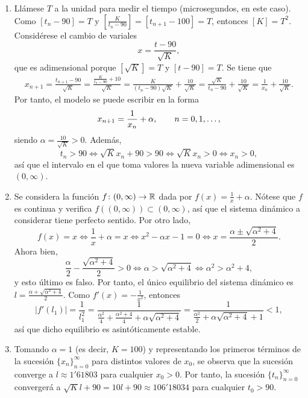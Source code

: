 \documentclass[11pt]{report}
\begin{document}
\begin{solution}
    \hfill
    \begin{enumerate}
        \item Llámese $T$ a la unidad para medir el tiempo (microsegundos, en este caso). Como $[t_n-90] = T$ y $[\frac{K}{t_n-90}] = [t_{n+1}-100]= T$, entonces $[K] = T^2$. Considérese el cambio de variales
        \[x = \frac{t-90}{\sqrt{K}},\]
        que es adimensional porque $[\sqrt{K}] = T$ y $[t-90] = T$. Se tiene que
        \begin{align*}
            x_{n+1} = \frac{t_{n+1}-90}{\sqrt{K}} =  \frac{\frac{K}{t_n-90}+10}{\sqrt{K}} = \frac{K}{(t_n-90)\sqrt{K}} + \frac{10}{\sqrt{K}} = \frac{\sqrt{K}}{t_n-90}+\frac{10}{\sqrt{K}} = \frac{1}{x_n}+\frac{10}{\sqrt{K}}.
        \end{align*}    
        Por tanto, el modelo se puede escribir en la forma
        \[x_{n+1} = \frac{1}{x_n}+\alpha, \qquad n = 0,1,\mathellipsis,\]
        siendo $\alpha = \frac{10}{\sqrt{K}} > 0$. Además,
        \[t_n > 90 \iff \sqrt{K}x_n+90 > 90 \iff \sqrt{K}x_n > 0 \iff x_n > 0,\]
        así que el intervalo en el que toma valores la nueva variable adimensional es $(0,\infty)$.
        \item Se considera la función $f \colon (0,\infty) \to \mathbb R$ dada por $f(x) = \frac{1}{x}+\alpha$. Nótese que $f$ es continua y verifica $f((0,\infty))\subset(0,\infty)$, así que el sistema dinámico a considerar tiene perfecto sentido. Por otro lado,
        \[f(x) = x \iff \frac{1}{x}+\alpha = x \iff x^2-\alpha x -1 = 0 \iff x = \frac{\alpha\pm \sqrt{\alpha^2+4}}{2}.\]
        Ahora bien,
        \[\frac{\alpha}{2}-\frac{\sqrt{\alpha^2+4}}{2} > 0 \iff \alpha>\sqrt{\alpha^2+4} \iff \alpha^2 > \alpha^2+4,\]
        y esto último es falso. Por tanto, el único equilibrio del sistema dinámico es $l = \frac{\alpha+\sqrt{\alpha^2+4}}{2}$. Como $f'(x) = -\frac{1}{x^2}$, entonces \[|f'(l_1)| = \frac{1}{l_1^2} = \frac{1}{\frac{\alpha^2}{4}+\frac{\alpha^2+4}{4}+\alpha\sqrt{\alpha^2+4}} = \frac{1}{\frac{\alpha^2}{2}+\alpha\sqrt{\alpha^2+4}+1} < 1,\]
        así que dicho equilibrio es asintóticamente estable.
        \item Tomando $\alpha = 1$ (es decir, $K = 100$) y representando los primeros términos de la sucesión $\{x_n\}_{n=0}^\infty$ para distintos valores de $x_0$, se observa que la sucesión converge a $l \approx 1'61803$ para cualquier $x_0 > 0$. Por tanto, la sucesión $\{t_n\}_{n=0}^\infty$ convergerá a $\sqrt{K}l+90 = 10l+90 \approx 106'18034$ para cualquier $t_0 > 90$.

\end{enumerate}
\end{solution}
\end{document}
